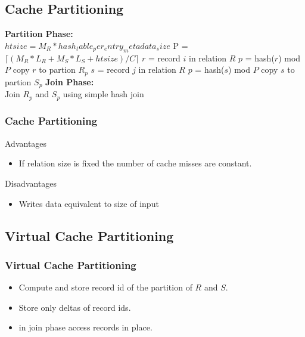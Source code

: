 \subsection{Cache Partitioning}

\begin{frame}

\begin{algorithm}[H]
\dontprintsemicolon
\SetVline
\tiny
{}

\textbf{Partition Phase:} \\
$htsize = M_R * hash_table_per_entry_metadata_size$ \;
P = $\lceil(M_R*L_R + M_S*L_S + htsize)/C\rceil$ \;
{
	$r$ = record $i$ in relation $R$ \;
	$p$ = hash($r$) mod $P$ \;
	copy $r$ to partion $R_p$ \;
}
{
	$s$ = record $j$ in relation $R$ \;
	$p$ = hash($s$) mod $P$ \;
	copy $s$ to partion $S_p$ \;
}
\textbf{Join Phase:} \\
{
	Join $R_p$ and $S_p$ using simple hash join \;
}
\end{algorithm}

\end{frame}


\begin{frame}[red] %
\frametitle{Cache Partitioning}

Advantages
\begin{itemize}
\item If relation size is fixed the number of cache misses are constant.
\end{itemize}

Disadvantages
\begin{itemize}
\item Writes data equivalent to size of input
\end{itemize}
\end{frame}


\subsection{Virtual Cache Partitioning}

\begin{frame}
\frametitle{Virtual Cache Partitioning}

\begin{itemize}
\item Compute and store record id of the partition of $R$ and $S$.
\item Store only deltas of record ids.
\item in join phase access records in place.
\end{itemize}

\end{frame}

